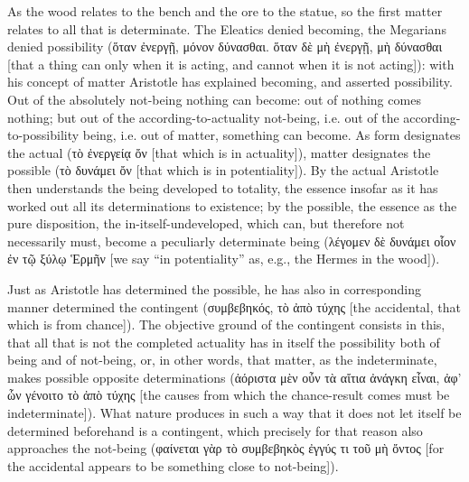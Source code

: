 \documentclass[12pt]{book}
\begin{document}
As the wood relates to the bench and the ore to the statue, so the first matter relates to all that
is determinate. The Eleatics denied becoming, the Megarians denied possibility (ὅταν ἐνεργῇ, μόνον
δύνασθαι. ὅταν δὲ μὴ ἐνεργῇ, μὴ δύνασθαι [that a thing can only when it is acting, and cannot when
it is not acting]): with his concept of matter Aristotle has explained becoming, and asserted
possibility. Out of the absolutely not-being nothing can become: out of nothing comes nothing; but
out of the according-to-actuality not-being, i.e. out of the according-to-possibility being, i.e.
out of matter, something can become. As form designates the actual (τὸ ἐνεργείᾳ ὄν [that which is
in actuality]), matter designates the possible (τὸ δυνάμει ὄν [that which is in potentiality]). By
the actual Aristotle then understands the being developed to totality, the essence insofar as it
has worked out all its determinations to existence; by the possible, the essence as the pure
disposition, the in-itself-undeveloped, which can, but therefore not necessarily must, become a
peculiarly determinate being (λέγομεν δὲ δυνάμει οἷον ἐν τῷ ξύλῳ Ἑρμῆν [we say ``in potentiality''
as, e.g., the Hermes in the wood]).

Just as Aristotle has determined the possible, he has also in corresponding manner determined the
contingent (συμβεβηκός, τὸ ἀπὸ τύχης [the accidental, that which is from chance]). The objective
ground of the contingent consists in this, that all that is not the completed actuality has in
itself the possibility both of being and of not-being, or, in other words, that matter, as the
indeterminate, makes possible opposite determinations (ἀόριστα μὲν οὖν τὰ αἴτια ἀνάγκη εἶναι, ἀφ'
ὧν γένοιτο τὸ ἀπὸ τύχης [the causes from which the chance-result comes must be indeterminate]).
What nature produces in such a way that it does not let itself be determined beforehand is a
contingent, which precisely for that reason also approaches the not-being (φαίνεται γὰρ τὸ
συμβεβηκὸς ἐγγύς τι τοῦ μὴ ὄντος [for the accidental appears to be something close to not-being]).
\end{document}
